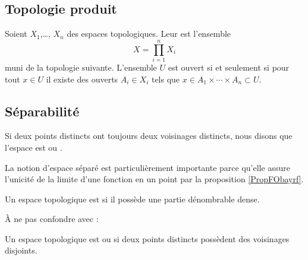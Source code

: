 \subsection{Topologie produit}

\begin{definition}      \label{DefIINHooAAjTdY}
    Soient \( X_1\),\ldots, \( X_n\) des espaces topologiques. Leur  est l'ensemble
    \begin{equation}
        X=\prod_{i=1}^nX_i
    \end{equation}
    muni de la topologie suivante. L'ensemble \( U\) est ouvert si et seulement si pour tout \( x\in U\) il existe des ouverts \( A_i\in X_i \) tels que \( x\in A_1\times \cdots\times A_n\subset U\).
\end{definition}

\subsection{Séparabilité}

\begin{definition}  \label{DefYFmfjjm}
    Si deux points distincts ont toujours deux voisinages distincts, nous disons que l'espace est  ou .
\end{definition}
La notion d'espace séparé est particulièrement importante parce qu'elle assure l'unicité de la limite d'une fonction en un point par la proposition \ref{PropFObayrf}.

\begin{definition}  \label{DefUADooqilFK}
    Un espace topologique est  si il possède une partie dénombrable dense.
\end{definition}
À ne pas confondre avec :
\begin{definition}  \label{DefWEOTrVl}
    Un espace topologique est  ou  si deux points distincts possèdent des voisinages disjoints.
\end{definition}

